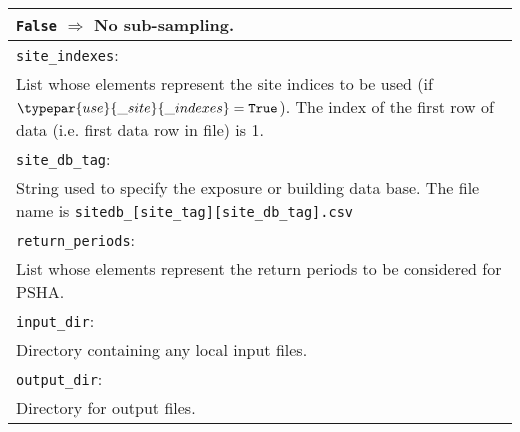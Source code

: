 \documentclass[a4paper, 12pt]{report}
\begin{document}
\begin{tabular}{|p{\textwidth}|}
 \hspace{0.5em} \texttt{False} $\Rightarrow$ No sub-sampling. \\
\hline \vspace{0.1em} \texttt{site\_indexes}: \\
List whose elements
represent the site
 indices to be used (if $\typepar{use}{\_site}{\_indexes}=\texttt{True}$). The
 index of the first row of data (i.e. first data row in file) is 1.\\
\hline \vspace{0.1em} \texttt{site\_db\_tag}: \\
String used to
specify the
 exposure or building data base.  The file name is \texttt{sitedb\_[site\_tag][site\_db\_tag].csv}\\
\hline \vspace{0.1em} \texttt{return\_periods}: \\
List whose
elements represent the
return periods to be considered for PSHA. \\
\hline \vspace{0.1em} \texttt{input\_dir}: \\
Directory containing any local input files.\\
\hline \vspace{0.1em} \texttt{output\_dir}: \\
Directory for output files.    \\
    \hline
 \end{tabular}
\end{document}
